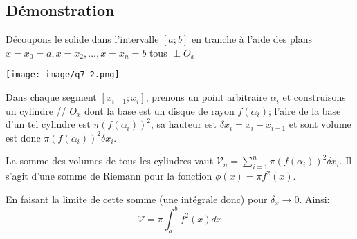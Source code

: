\documentclass[12pt,a4paper]{report}
\begin{document}
	\subsection*{Démonstration}
	Découpons le solide dans l'intervalle $[a;b]$ en tranche à l'aide des plans $x=x_0=a,x=x_2,...,x=x_n=b$ tous $\perp O_x$
	
	\texttt{[image: image/q7\_2.png]}
	\vspace{1cm}
	
	Dans chaque segment $[x_{i-1};x_i]$, prenons un point arbitraire $\alpha_{i}$ et construisons un cylindre // $O_x$ dont la base est un disque de rayon $f(\alpha_{i})$; l'aire de la base d'un tel cylindre est $\pi(f(\alpha_{i}))^2$, sa hauteur est $\delta x_i =x_{i}-x_{i-1}$ et sont volume est donc $\pi(f(\alpha_{i}))^2 \delta x_i$.
	
	\vspace{1cm}
	La somme des volumes de tous les cylindres vaut $\mathcal{V}_n= \sum\limits_{i=1}^{n} \pi(f(\alpha_{i}))^2 \delta x_i$. Il s'agit d'une somme de Riemann pour la fonction $\phi (x) = \pi f^2(x)$.
	
	\medskip
	En faisant la limite de cette somme (une intégrale donc) pour $\delta_x \rightarrow 0$. Ainsi: \[ \mathcal{V}=\pi \int_{a}^{b}f^2(x)dx \]

	
	
	
	
\end{document}
